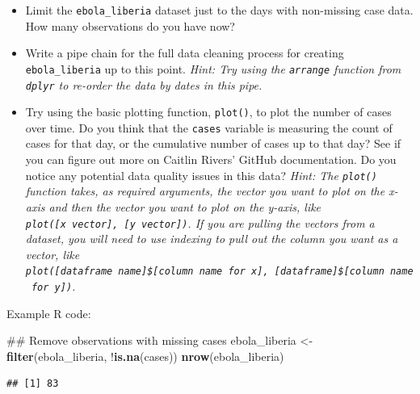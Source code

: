 \documentclass[]{book}
\makeatletter
\newenvironment{Shaded}{\begin{snugshade}}{\end{snugshade}}
\newcommand{\KeywordTok}[1]{\textcolor[rgb]{0.13,0.29,0.53}{\textbf{{#1}}}}
\newcommand{\DataTypeTok}[1]{\textcolor[rgb]{0.13,0.29,0.53}{{#1}}}
\newcommand{\StringTok}[1]{\textcolor[rgb]{0.31,0.60,0.02}{{#1}}}
\newcommand{\NormalTok}[1]{{#1}}
\providecommand{\tightlist}{%
  \setlength{\itemsep}{0pt}\setlength{\parskip}{0pt}}
\newenvironment{kframe}{%
\medskip{}
\setlength{\fboxsep}{.8em}
 \def\at@end@of@kframe{}%
 \ifinner\ifhmode%
  \def\at@end@of@kframe{\end{minipage}}%
  \begin{minipage}{\columnwidth}%
 \fi\fi%
 \def\FrameCommand##1{\hskip\@totalleftmargin \hskip-\fboxsep
 \colorbox{shadecolor}{##1}\hskip-\fboxsep
     \hskip-\linewidth \hskip-\@totalleftmargin \hskip\columnwidth}%
 \MakeFramed {\advance\hsize-\width
   \@totalleftmargin\z@ \linewidth\hsize
   \@setminipage}}%
 {\par\unskip\endMakeFramed%
 \at@end@of@kframe}
\renewenvironment{Shaded}{\begin{kframe}}{\end{kframe}}
\makeatother
\begin{document}
\begin{itemize}
\tightlist
\item
  Limit the \texttt{ebola\_liberia} dataset just to the days with
  non-missing case data. How many observations do you have now?
\item
  Write a pipe chain for the full data cleaning process for creating
  \texttt{ebola\_liberia} up to this point. \emph{Hint: Try using the
  \texttt{arrange} function from \texttt{dplyr} to re-order the data by
  dates in this pipe.}
\item
  Try using the basic plotting function, \texttt{plot()}, to plot the
  number of cases over time. Do you think that the \texttt{cases}
  variable is measuring the count of cases for that day, or the
  cumulative number of cases up to that day? See if you can figure out
  more on Caitlin Rivers' GitHub documentation. Do you notice any
  potential data quality issues in this data? \emph{Hint: The
  \texttt{plot()} function takes, as required arguments, the vector you
  want to plot on the x-axis and then the vector you want to plot on the
  y-axis, like \texttt{plot({[}x\ vector{]},\ {[}y\ vector{]})}. If you
  are pulling the vectors from a dataset, you will need to use indexing
  to pull out the column you want as a vector, like
  \texttt{plot({[}dataframe\ name{]}\${[}column\ name\ for\ x{]},\ {[}dataframe{]}\${[}column\ name\ for\ y{]})}.}
\end{itemize}

Example R code:

\begin{Shaded}
\begin{Highlighting}[]
\NormalTok{## Remove observations with missing cases}
\NormalTok{ebola_liberia <-}\StringTok{ }\KeywordTok{filter}\NormalTok{(ebola_liberia, !}\KeywordTok{is.na}\NormalTok{(cases))}
\KeywordTok{nrow}\NormalTok{(ebola_liberia)}
\end{Highlighting}
\end{Shaded}

\begin{verbatim}
## [1] 83
\end{verbatim}

\begin{Shaded}
\end{Shaded}
\end{document}
